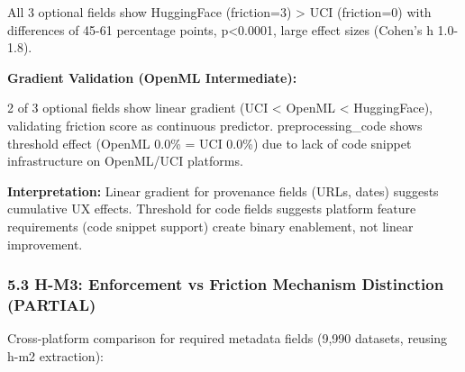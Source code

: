 All 3 optional fields show HuggingFace (friction=3) > UCI (friction=0) with differences of 45-61 percentage points, p<0.0001, large effect sizes (Cohen's h 1.0-1.8).

\textbf{Gradient Validation (OpenML Intermediate):}

\begin{table}[htbp]
\centering
{}
\end{table}

2 of 3 optional fields show linear gradient (UCI < OpenML < HuggingFace), validating friction score as continuous predictor. preprocessing\_code shows threshold effect (OpenML 0.0\% = UCI 0.0\%) due to lack of code snippet infrastructure on OpenML/UCI platforms.

\textbf{Interpretation:} Linear gradient for provenance fields (URLs, dates) suggests cumulative UX effects. Threshold for code fields suggests platform feature requirements (code snippet support) create binary enablement, not linear improvement.

\subsubsection{5.3 H-M3: Enforcement vs Friction Mechanism Distinction (PARTIAL)}

Cross-platform comparison for required metadata fields (9,990 datasets, reusing h-m2 extraction):

\begin{table}[htbp]
\centering
{}
\end{table}

